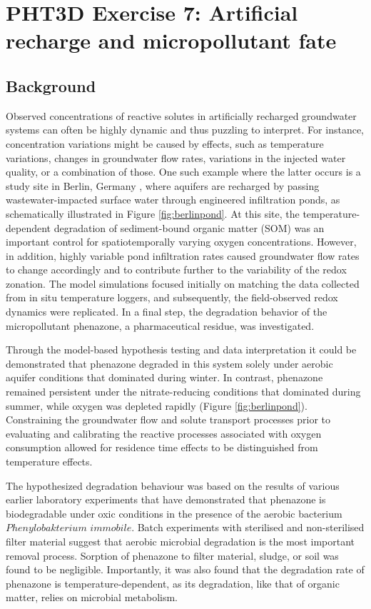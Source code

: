 \section[PHT3D Exercise 5: Artificial recharge and micropollutant fate]{PHT3D Exercise 7: Artificial recharge and micropollutant fate}

\subsection[Background]{Background}
Observed concentrations of reactive solutes in artificially recharged groundwater systems 
can often be highly dynamic and thus puzzling to interpret. For instance, 
concentration variations might be caused by effects, such as temperature variations, 
changes in groundwater flow rates, variations in the injected water quality, or a combination of those. 
One such example where the latter occurs is a study site in Berlin, Germany \citep[]{greskowiak_2006}, 
where aquifers are  recharged by passing wastewater-impacted surface water through 
engineered infiltration ponds, as schematically illustrated in Figure \ref{fig:berlinpond}. 
At this site, the temperature-dependent degradation of sediment-bound 
organic matter (SOM) was an important control for spatiotemporally varying oxygen concentrations. 
However, in addition, highly variable pond infiltration rates caused 
groundwater flow rates to change accordingly and to contribute 
further to the variability of the redox zonation. The model simulations focused 
initially on matching the data collected from in situ temperature loggers, 
and subsequently, the field-observed redox dynamics were replicated. 
In a final step, the degradation behavior of the micropollutant phenazone, 
a pharmaceutical residue, was investigated. 
\par Through the model-based hypothesis testing and data interpretation 
it could be demonstrated that phenazone degraded in this system solely 
under aerobic aquifer conditions that dominated during winter. 
In contrast, phenazone remained persistent under the nitrate-reducing conditions 
that dominated during summer, while oxygen was depleted rapidly (Figure \ref{fig:berlinpond}).
Constraining the groundwater flow and solute transport processes prior 
to evaluating and calibrating the reactive processes associated with oxygen 
consumption allowed for residence time effects to be distinguished from temperature effects.

\par The hypothesized degradation behaviour was based on the results 
of various earlier laboratory experiments that have demonstrated that 
phenazone is biodegradable under oxic conditions \citep{phdzuelke} 
in the presence of the aerobic bacterium $Phenylobakterium$ $immobile$. 
Batch experiments with sterilised and non-sterilised filter material suggest that aerobic microbial
degradation is the most important removal process.
Sorption of phenazone to filter material, sludge, or soil was
found to be negligible. Importantly, it was also found that the degradation
rate of phenazone is temperature-dependent, as its degradation,
like that of organic matter, relies on microbial metabolism.

